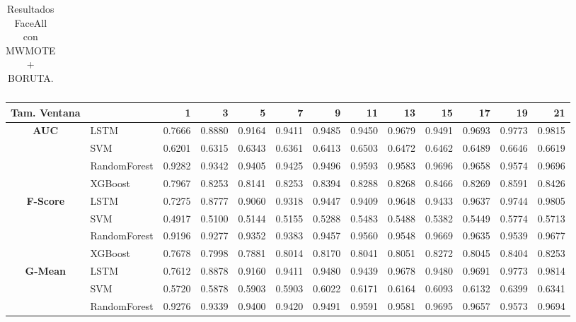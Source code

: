 \begin{table}[h]
\begin{adjustbox}{max width=11cm}
\begin{tabular}{|c|l|r|r|r|r|r|r|r|r|r|r|r|}
		\end{tabular}
	\end{adjustbox}	
	\caption{Resultados FaceAll con MWMOTE + BORUTA.}
	\label{tab:faceAllMWMOTEBORUTA}
\end{table}


\begin{table}[h]
	\centering
	\begin{adjustbox}{max width=15cm}
		\begin{tabular}{|c|l|r|r|r|r|r|r|r|r|r|r|r|}
			\hline
			\textbf{Tam. Ventana}&         &      1  &      3  &      5  &      7  &      9  &      11 &      13 &      15 &      17 &      19 &      21 \\
			\hline
			\textbf{AUC} & LSTM &  0.7666 &  0.8880 &  0.9164 &  0.9411 &  0.9485 &  0.9450 &  0.9679 &  0.9491 &  0.9693 &  0.9773 &  0.9815 \\
			& SVM &  0.6201 &  0.6315 &  0.6343 &  0.6361 &  0.6413 &  0.6503 &  0.6472 &  0.6462 &  0.6489 &  0.6646 &  0.6619 \\
			& RandomForest &  0.9282 &  0.9342 &  0.9405 &  0.9425 &  0.9496 &  0.9593 &  0.9583 &  0.9696 &  0.9658 &  0.9574 &  0.9696 \\
			& XGBoost &  0.7967 &  0.8253 &  0.8141 &  0.8253 &  0.8394 &  0.8288 &  0.8268 &  0.8466 &  0.8269 &  0.8591 &  0.8426 \\
			\hline
			\textbf{F-Score} & LSTM &  0.7275 &  0.8777 &  0.9060 &  0.9318 &  0.9447 &  0.9409 &  0.9648 &  0.9433 &  0.9637 &  0.9744 &  0.9805 \\
			& SVM &  0.4917 &  0.5100 &  0.5144 &  0.5155 &  0.5288 &  0.5483 &  0.5488 &  0.5382 &  0.5449 &  0.5774 &  0.5713 \\
			& RandomForest &  0.9196 &  0.9277 &  0.9352 &  0.9383 &  0.9457 &  0.9560 &  0.9548 &  0.9669 &  0.9635 &  0.9539 &  0.9677 \\
			& XGBoost &  0.7678 &  0.7998 &  0.7881 &  0.8014 &  0.8170 &  0.8041 &  0.8051 &  0.8272 &  0.8045 &  0.8404 &  0.8253 \\
			\hline
			\textbf{G-Mean} & LSTM &  0.7612 &  0.8878 &  0.9160 &  0.9411 &  0.9480 &  0.9439 &  0.9678 &  0.9480 &  0.9691 &  0.9773 &  0.9814 \\
			& SVM &  0.5720 &  0.5878 &  0.5903 &  0.5903 &  0.6022 &  0.6171 &  0.6164 &  0.6093 &  0.6132 &  0.6399 &  0.6341 \\
			& RandomForest &  0.9276 &  0.9339 &  0.9400 &  0.9420 &  0.9491 &  0.9591 &  0.9581 &  0.9695 &  0.9657 &  0.9573 &  0.9694 \\

\end{tabular}
\end{adjustbox}
\end{table}
